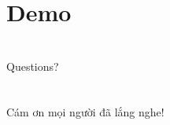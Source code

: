 \documentclass[14pt]{beamer}
\begin{document}
\section{Demo}
\begin{frame}
  \begin{center}
  \end{center}
\end{frame}

\section*{}
\begin{frame}
  \begin{center}
    \Huge Questions?
  \end{center}
\end{frame}

\section*{}
\begin{frame}
    \begin{center}
      \Huge Cám ơn mọi người đã lắng nghe!
    \end{center}
\end{frame}
\end{document}
